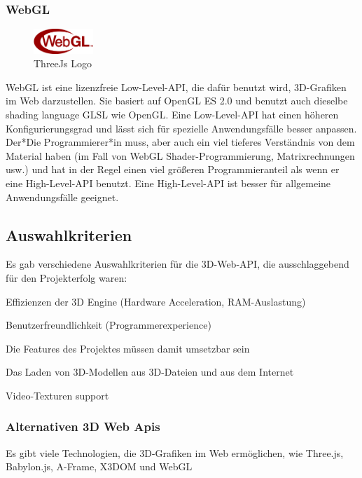\subsubsection{WebGL}
\label{ch::webgl}
\begin{figure}
    \begin{center}
      \includegraphics[width=0.2\textwidth]{pics/WebGL_Logo.png}
     \caption{ThreeJs Logo}
    \end{center}
\end{figure}
WebGL ist eine lizenzfreie Low-Level-API, die dafür benutzt wird, 3D-Grafiken im Web darzustellen. Sie basiert auf OpenGL ES 2.0 und benutzt auch dieselbe shading language GLSL wie OpenGL. Eine Low-Level-API hat einen höheren Konfigurierungsgrad und lässt sich für spezielle Anwendungsfälle besser anpassen. Der*Die Programmierer*in muss, aber auch ein viel tieferes Verständnis von dem Material haben (im Fall von WebGL Shader-Programmierung, Matrixrechnungen usw.) und hat in der Regel einen viel größeren Programmieranteil als wenn er eine High-Level-API benutzt. Eine High-Level-API  ist besser für allgemeine Anwendungsfälle geeignet.
\cite[WebGl Getting Started]{WebglGettingStarted} \cite{HighlowAPI}


\subsection{Auswahlkriterien}
Es gab verschiedene Auswahlkriterien für die 3D-Web-API, die ausschlaggebend für den Projekterfolg waren:
\begin{compactitem}
  \item Effizienzen der 3D Engine (Hardware Acceleration, RAM-Auslastung)
  \item Benutzerfreundlichkeit (Programmerexperience)
  \item Die Features des Projektes müssen damit umsetzbar sein
  \begin{compactenum}
    \item Das Laden von 3D-Modellen aus 3D-Dateien und aus dem Internet
    \item Video-Texturen support
  \end{compactenum}
\end{compactitem}

\subsubsection{Alternativen 3D Web Apis}
Es gibt viele Technologien, die 3D-Grafiken im Web ermöglichen, wie Three.js, Babylon.js, A-Frame, X3DOM und WebGL

